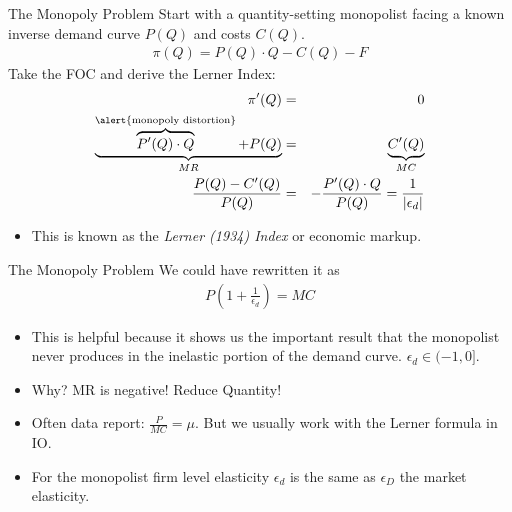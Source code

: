 \documentclass[xcolor=pdftex,dvipsnames,table,mathserif,aspectratio=169]{beamer}
\begin{document}
\begin{frame}{The Monopoly Problem}
Start with a quantity-setting monopolist facing a known inverse demand curve $P(Q)$ and costs $C(Q)$.
\begin{eqnarray*}
\pi(Q) = P(Q) \cdot Q - C(Q) -  F
\end{eqnarray*}
Take the FOC and derive the \alert{Lerner Index}:
\begin{eqnarray*}
\pi'(Q) &=& 0  \\
 \underbrace{\overbrace{P'(Q) \cdot Q}^{\text{\alert{monopoly distortion}}}+ P(Q)}_{MR}  &=&  \underbrace{C'(Q)}_{MC} \\
  \frac{P(Q) - C'(Q)}{P(Q)} &=& - \frac{P'(Q) \cdot Q}{P(Q)} = \frac{1}{|\epsilon_d|}
\end{eqnarray*}
\begin{itemize}
\item This is known as the \textit{Lerner (1934) Index} or \alert{economic markup}.
\end{itemize}
\end{frame}

\begin{frame}{The Monopoly Problem}
We could have rewritten it as 
\begin{eqnarray*}
P \left( 1+\frac{1}{\epsilon_d} \right) = MC
\end{eqnarray*}
\begin{itemize}
\item This is helpful because it shows us the important result that the monopolist never produces in the inelastic portion of the demand curve. $\epsilon_d \in (-1,0]$.
\item Why? MR is negative! Reduce Quantity!
\item Often data report: $\frac{P}{MC}= \mu$. But we usually work with the Lerner formula in IO.
\item For the monopolist firm level elasticity $\epsilon_d$ is the same as $\epsilon_D$ the market elasticity.
\end{itemize}
\end{frame}
\end{document}
